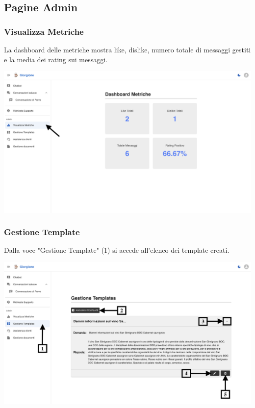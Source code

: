 \newpage
\subsection{Pagine Admin}

\subsubsection{Visualizza Metriche}
La dashboard delle metriche mostra like, dislike, numero totale di messaggi gestiti e la media dei rating sui messaggi.
\begin{center}
    \includegraphics[width=\textwidth]{./img/visualizzaMetriche.png}
    \label{fig:Metriche}
\end{center}

\subsubsection{Gestione Template}
Dalla voce "Gestione Template" (1) si accede all’elenco dei template creati.
\begin{center}
    \includegraphics[width=\textwidth]{./img/GestioneTemplate.png}
    \label{fig:Template}
\end{center}

